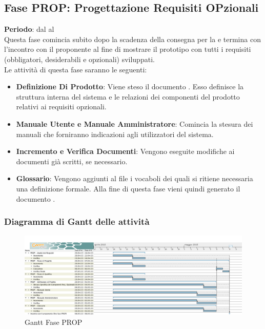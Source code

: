 \subsection{Fase PROP: Progettazione Requisiti OPzionali}
	\textbf{Periodo}: dal  al  \\Questa fase comincia subito dopo la scadenza della consegna per la  e termina con l'incontro con il proponente al fine di mostrare il prototipo con tutti i requisiti (obbligatori, desiderabili e opzionali) sviluppati. 
	\\Le attività di questa fase saranno le seguenti:
	\begin{itemize}
		\item\textbf{Definizione Di Prodotto}: Viene steso il documento . Esso definisce la struttura interna del sistema e le relazioni dei componenti del prodotto relativi ai requisiti opzionali.
		\item\textbf{Manuale Utente e Manuale Amministratore}: Comincia la stesura dei manuali che forniranno indicazioni agli utilizzatori del sistema.
		\item\textbf{Incremento e Verifica Documenti}: Vengono eseguite modifiche ai documenti già scritti, se necessario.
		\item\textbf{Glossario}: Vengono aggiunti al file  i vocaboli dei quali si ritiene necessaria una definizione formale. Alla fine di questa fase vieni quindi generato il documento .
	\end{itemize}
	\subsubsection{Diagramma di Gantt delle attività}
	\begin{figure}[H]\centering
		\includegraphics[width=\textwidth]{PianoDiProgetto/Pics/FasePROP.png}
	\caption{Gantt Fase PROP}
\end{figure}
